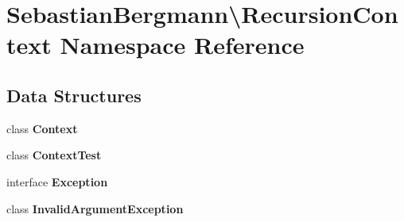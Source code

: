 \section{Sebastian\+Bergmann\textbackslash{}Recursion\+Context Namespace Reference}
\label{namespace_sebastian_bergmann_1_1_recursion_context}
\subsection*{Data Structures}
\begin{DoxyCompactItemize}
\item 
class {\bf Context}
\item 
class {\bf Context\+Test}
\item 
interface {\bf Exception}
\item 
class {\bf Invalid\+Argument\+Exception}
\end{DoxyCompactItemize}
